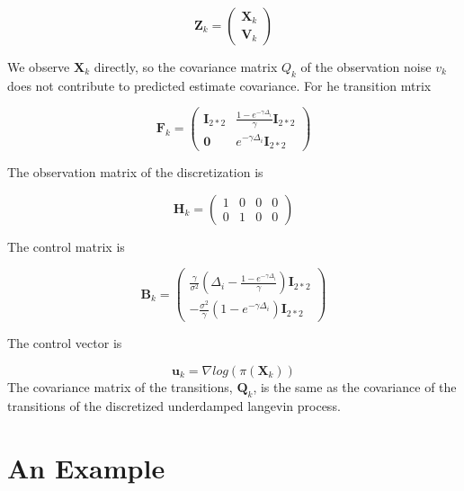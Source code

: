 $$
\textbf{Z}_k= \begin{pmatrix}
    \textbf{X}_k \\
    \textbf{V}_k
\end{pmatrix}
$$

We observe $\textbf{X}_k$ directly, so the covariance matrix $Q_k$ of the observation noise $v_k$ does not contribute to predicted estimate covariance. For he transition mtrix 


$$
\textbf{F}_k = \begin{pmatrix}
    \textbf{I}_{2*2} & \frac{1-e^{-\gamma\Delta_i}}{\gamma} \textbf{I}_{2*2}\\ 
    \textbf{0} & e^{-\gamma\Delta_i} \textbf{I}_{2*2}
\end{pmatrix}
$$

The observation matrix of the discretization is

$$
\textbf{H}_k = \begin{pmatrix}
    1 & 0 & 0 & 0 \\
    0 & 1 & 0 & 0
\end{pmatrix}
$$

The control matrix is

$$
\textbf{B}_k = \begin{pmatrix}
    \frac{\gamma}{\sigma^2}(\Delta_i - \frac{1-e^{-\gamma\Delta_i}}{\gamma})\textbf{I}_{2*2} \\
    -\frac{\sigma^2}{\gamma}(1-e^{-\gamma \Delta_i})\textbf{I}_{2*2}
\end{pmatrix}
$$

The control vector is 

$$
\textbf{u}_k = \nabla log(\pi(\textbf{X}_k))
$$
The covariance matrix of the transitions, $\textbf{Q}_k$, is the same as the covariance of the transitions of the discretized underdamped langevin process.

\cite{reid_1_nodate}


\section{An Example}


